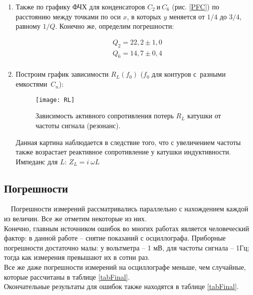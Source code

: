 \documentclass{lab}
\begin{document}
\begin{enumerate}
\item
Также по графику ФЧХ для конденсаторов $ C_2 \ и \ C_6 $ (рис. \ref{PFC}) по расстоянию между
точками по оси $ x $, в которых $ y $ меняется от $ 1/4 $ до $ 3/4 $, равному $ 1/Q $.
Конечно же, определим погрешности:

\begin{equation}
\begin{aligned}
&Q_2 = 22,2 \pm 1,0\\
&Q_6 = 14,7 \pm 0,4\\
\end{aligned}
\end{equation}

\newpage

\item
Построим график зависимости $ R_L(f_0) $ ($ f_0 $ для контуров с~разными емкостями~$ C_n $):

\begin{figure}[H]
	\centering
	\texttt{[image: RL]}
	\caption{\footnotesize
	Зависимость активного сопротивления потерь $ R_L $ катушки от частоты сигнала (резонанс).
	}
	\label{RL}
\end{figure}

Данная картина наблюдается в следствие того, что с увеличением частоты также возрастает
реактивное сопротивление у катушки индуктивности. Импеданс для $ L $:
$ Z_L = i \: \omega L $

\end{enumerate}

\vspace{-0.7cm}

\subsection*{Погрешности}

\vspace{-0.3cm}

\ \ Погрешности измерений рассматривались параллельно с нахождением каждой из величин.
Все же отметим некоторые из них.\\
Конечно, главным источником ошибок во многих работах является человеческий фактор:
в данной работе -- снятие показаний с осциллографа. Приборные погрешности достаточно малы:
у вольтметра -- 1 мВ, для частоты сигнала -- 1Гц; тогда как измерения превышают их
в сотни раз.\\
Все же даже погрешности измерений на осциллографе меньше, чем случайные, которые рассчитаны
в таблице \ref{tabFinal}.\\
Окончательные результаты для ошибок также находятся в таблице \ref{tabFinal}.
\end{document}
